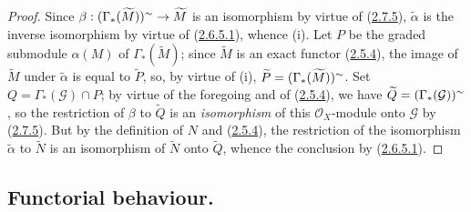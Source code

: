 \begin{proof}
Since $\beta:(\Gamma_*(\widetilde{M}))^{\sim}
\to\widetilde{M}$ is an isomorphism by virtue of
(\hyperref[II.2.7.5]{2.7.5}), $\widetilde{\alpha}$ is the inverse
isomorphism by virtue of (\hyperref[II.2.6.5.1]{2.6.5.1}), whence (i). Let
$P$ be the graded submodule $\alpha(M)$ of $\Gamma_*(\widetilde{M})$; since
$\widetilde{M}$ is an exact functor
(\hyperref[II.2.5.4]{2.5.4}), the image of $\widetilde{M}$ under
$\widetilde{\alpha}$ is equal to $\widetilde{P}$, so, by virtue of (i),
$\widetilde{P}=(\Gamma_*(\widetilde{M}))^{\sim}$. Set
$Q=\Gamma_*(\mathcal{G})\cap P$; by virtue of the foregoing and of
(\hyperref[II.2.5.4]{2.5.4}), we have
$\widetilde{Q}=(\Gamma_*(\mathcal{G}))^{\sim}$, so the restriction of
$\beta$ to $\widetilde{Q}$ is an \emph{isomorphism} of this
$\mathcal{O}_X$-module onto $\mathcal{G}$ by
(\hyperref[II.2.7.5]{2.7.5}). But by the definition of $N$ and
(\hyperref[II.2.5.4]{2.5.4}), the restriction of the isomorphism
$\widetilde{\alpha}$ to $\widetilde{N}$ is an isomorphism of $\widetilde{N}$
onto $\widetilde{Q}$, whence the conclusion by
(\hyperref[II.2.6.5.1]{2.6.5.1}).
\end{proof}

\subsection{Functorial behaviour.}
\label{subsection:II.2.8}

